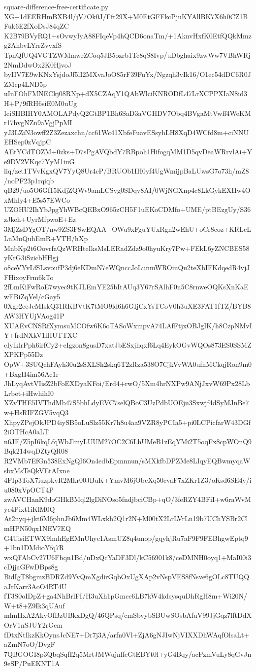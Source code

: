 \documentclass[11pt]{article}
\theoremstyle{definition}
\theoremstyle{remark}
\begin{document}
\begin{filecontents*}[overwrite]{square-difference-free-certificate.py}
XG+1dEERHmBXB4l/jV7Ok0J/Fft29X+M0EtGFFkcPjuKYAllBK7X6h0CZ1BFuk6E2fXoDsJ84qZC
K2B79BVyRQ1+sOvwyIyA88FIqeVp4hQCD6onaTm/+1AknvHxfK0EtfQQkMmzg2AhbvLYrrZvvxfS
TpnQfUQ4VGTZWMmwrZCoq5JB5ozrb1Tc8qS8Ivp/uDbghaix9zwWw7VBhWRj2NmDdwOx2K0HjvoJ
byIIV7E9wKNxYsjdoJf5lI2MXvaJoO85rF39FuYx/Ngzqh3vIk16/O1ec54dDC6R0JZMcp4LND5p
uInFOhFMNECkj08RNp+dX5CZAqY1QAbWlciKNRODfL47LrXCPPXIaN8id3H+P/9fRH6siE0M0uUg
IeiSHBIHY0AMOLAPdyQ2GtBP1Bh6SaD3aVGHDV7Obq4BVgaMtVwff4WeKMr17hvgNZn9aVgjPpMI
yJ3LZiN3owff2Z3Zezaxchn/cc61Wc41XbfeFuavESsyhLH8XqD4WCfd8m+ciNNUEHSep0zVqjpC
AEtYCdTOZM+0zks+D7sPgAVQbdY7RBpoh1HifogqMM1D5qvDeaWRrvlAi+Ye9DV2VKqc7YyM1iuG
liq/zet1TVvKgxQV7YyQ8Ur4cP/BRUOb1IH0yf4UgWmijpBaLUwsG7o73h/mZ8/noPF23p1rqiqb
qB29/uo5O6Gf15KdjZQWv9amLCSvg0SDqv8AI/0WjNGXnp4c8LkGykEXHw4OxMhly4+E5s57EWCo
UZOHU2IhYbJpgYhWBcQEBxO965zCH5F1uEKoCDMfo+UME/ptBEzgUy/S36zJkeh+UyrMfpwoE+Ez
3MjZsDYgOT/nw9ZS3F8wEQAA+OWu9xFguYUxRgn2wEhU+oCr8coz+KRLcLLnMuQuhEmR+VTH/hXp
MnbKp2t6OovrfaQzWRHteIksMsLERadZdz9o0hyuKry7Pw+FEkL6yZNCBES58yKrG3iSzicbHHgj
o8ceVYvLfSLsvoufP3dj6eKDmN7eWQnccJoLunmWROiuQu2teXbIFKdqedR4vjJFHixoyFrm6kTo
2fLmKiFwRoE7wyec9tKJLEmYE25bItAUq3Y67rSAlhF0n5C8rnweOQKsXnKaEwEBiZqVel/cGay5
0Xgr2eeJcMIskQ31RKBVtK7tMO9ld6h6GIjCxYsTCoV0h3uXE3FAT1fTZ/BYB8AW3HYUjVAog41P
XUAEvCNSRfXymsuMCOfw6K6oTASoWxmpvA74LAfFtjxOBJgIK/h8CzpNMvIY+frdNXkV1lHUTTXC
cIylklrPph6irfCy2+cIgzon8gusD7xatJbESxjhqxf6Lq4EykOGvWQOs873ES0SSMZXPKPp55Dz
OpW+3SUQchFAyh30u2sSXLSh2skq6T2zRza538O7CjkVvWA0ufnMCkqjRon9m0+BxgH4im56Ac1r
JhLyqAvtVIisZ2bFoEXDyaKFoi/Erd4+rwO/5Xm4hrNXPw9ANjJxvW69Px28LbLrbet+iHwhihI0
XZvTHE5IVThdMb47S5bhLdyEVC7selQBoC3UzPdbUOEju3Sxwjf4dSyMJnBe7w+HsRIFZGV5vqQ3
XhpyZPejOkJPD4iySB5oLuSlz55Kr7h8u4aa9VZR8yPCIa5+pi0LCPicfarW43DGf2iOTHcA0aLT
n6JE/Z5pI6kqLfqWbJlmyLUUM27OC2C6LhUMeB1zEqYMi2T5oqFx8cpWOnQ9Bqk214wqDZtyQR08
R2VMb7EfGn538ExNgQI6On4edbEpmnnun/sMXkfbDPZMe8LIqyEQBwmyqaWsbxMsTeQkVEtAIxne
4FIp3ToX7iuzpkvR2Mkr00JBuK+YmvM6jObcXq50cvaF7xZKr1Z3/oKsd6SE4y/iu080xVpOCT4P
zwAVCHanK9doGHkBMql2lgDiNOso5fndjbciCBp+qO/3feRZY4BFiI+w6raWvMyc4Pixt1iKlM0Q
At2nyq+jkt6M6phnJb6Mm4WLxkb2Q1r2N+M00tX2LrLVrLn19b7UChYSBr2ClmHPN50qx1NEV7EQ
G4UisiETWX9lmhEgEMnUhyc1AsmUZ8q4unop/gqyhjRu7aF9F9FEBhgwEptq9+1bn1DMdioYfq7R
wxQFAbCv27U6Fbqn1Bd/uDxQcYaDF3Dl/kC56901k8/ceDMNH0oyq1+MaI00i3cDjjaGFwDBps8g
BidIgT8bgmzBDRZd9YvQmXgdirGqbOxUgXAp2vNspVES8fNsve6gOLc8TUQQaJrKarr3AoO4RT4U
fT3S0oIDpZ+ga4NhBrlFI/H3uXh1pGmce6LB7kW4kdsysquDhRgH8m+Wi20N/W+t8+Z9Ik3qUAuf
mlmHxA2AkyOfBzUBkxDgQ/46QPsq/cmSbvybSBUwSOsbAfuV99JjGqz7lftDdXOrV1nSJUY2rGcm
fDtxNtIkzKkOynsJcNE7+Dr7j3A/arfn0Vl+ZjA6gNJIwNjVIXXDhWAqfOlsaLt+aZmN7oO/DvgF
7QBGOGI8p3QbqSqfI2q5MrtJMWujnlfeGtEBYt0l+yG4Bqy/acPzmVuLy8qGvJn9eSP/PuEKNT1A

\end{filecontents*}
\end{document}
